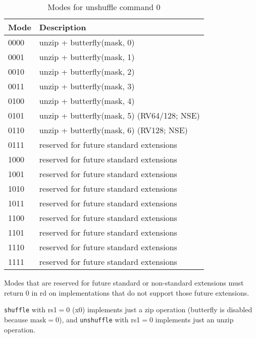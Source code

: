\begin{table}[h]
\begin{small}
\begin{center}
\begin{tabular}{l l}
Mode & Description \\ \hline

0000 & unzip + butterfly(mask, 0) \\
0001 & unzip + butterfly(mask, 1) \\
0010 & unzip + butterfly(mask, 2) \\
0011 & unzip + butterfly(mask, 3) \\
0100 & unzip + butterfly(mask, 4) \\
0101 & unzip + butterfly(mask, 5) (RV64/128; NSE) \\
0110 & unzip + butterfly(mask, 6) (RV128; NSE) \\
0111 & reserved for future standard extensions \\

\hline

1000 & reserved for future standard extensions \\
1001 & reserved for future standard extensions \\
1010 & reserved for future standard extensions \\
1011 & reserved for future standard extensions \\
1100 & reserved for future standard extensions \\
1101 & reserved for future standard extensions \\
1110 & reserved for future standard extensions \\
1111 & reserved for future standard extensions \\

\hline

\end{tabular}
\end{center}
\end{small}
\caption{Modes for unshuffle command 0}
\label{unshuffle-modes}
\end{table}

Modes that are reserved for future standard or non-standard extensions must return
0 in rd on implementations that do not support those future extensions.

\texttt{shuffle} with rs1$=$0 (x0) implements just a zip operation (butterfly is
disabled because mask$=$0), and \texttt{unshuffle} with rs1$=$0 implements just
an unzip operation.


